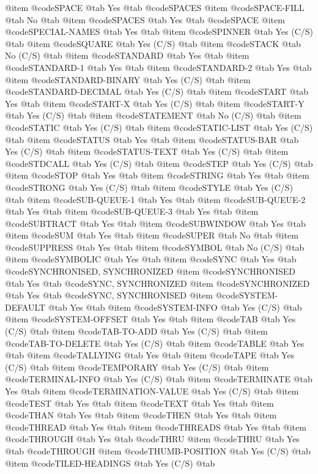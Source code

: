 @item @code{SPACE} @tab Yes @tab @code{SPACES}
@item @code{SPACE-FILL} @tab No @tab 
@item @code{SPACES} @tab Yes @tab @code{SPACE}
@item @code{SPECIAL-NAMES} @tab Yes @tab 
@item @code{SPINNER} @tab Yes	(C/S) @tab 
@item @code{SQUARE} @tab Yes	(C/S) @tab 
@item @code{STACK} @tab No	(C/S) @tab 
@item @code{STANDARD} @tab Yes @tab 
@item @code{STANDARD-1} @tab Yes @tab 
@item @code{STANDARD-2} @tab Yes @tab 
@item @code{STANDARD-BINARY} @tab Yes	(C/S) @tab 
@item @code{STANDARD-DECIMAL} @tab Yes	(C/S) @tab 
@item @code{START} @tab Yes @tab 
@item @code{START-X} @tab Yes	(C/S) @tab 
@item @code{START-Y} @tab Yes	(C/S) @tab 
@item @code{STATEMENT} @tab No	(C/S) @tab 
@item @code{STATIC} @tab Yes	(C/S) @tab 
@item @code{STATIC-LIST} @tab Yes	(C/S) @tab 
@item @code{STATUS} @tab Yes @tab 
@item @code{STATUS-BAR} @tab Yes	(C/S) @tab 
@item @code{STATUS-TEXT} @tab Yes	(C/S) @tab 
@item @code{STDCALL} @tab Yes	(C/S) @tab 
@item @code{STEP} @tab Yes	(C/S) @tab 
@item @code{STOP} @tab Yes @tab 
@item @code{STRING} @tab Yes @tab 
@item @code{STRONG} @tab Yes	(C/S) @tab 
@item @code{STYLE} @tab Yes	(C/S) @tab 
@item @code{SUB-QUEUE-1} @tab Yes @tab 
@item @code{SUB-QUEUE-2} @tab Yes @tab 
@item @code{SUB-QUEUE-3} @tab Yes @tab 
@item @code{SUBTRACT} @tab Yes @tab 
@item @code{SUBWINDOW} @tab Yes @tab 
@item @code{SUM} @tab Yes @tab 
@item @code{SUPER} @tab No @tab 
@item @code{SUPPRESS} @tab Yes @tab 
@item @code{SYMBOL} @tab No	(C/S) @tab 
@item @code{SYMBOLIC} @tab Yes @tab 
@item @code{SYNC} @tab Yes @tab @code{SYNCHRONISED, SYNCHRONIZED}
@item @code{SYNCHRONISED} @tab Yes @tab @code{SYNC, SYNCHRONIZED}
@item @code{SYNCHRONIZED} @tab Yes @tab @code{SYNC, SYNCHRONISED}
@item @code{SYSTEM-DEFAULT} @tab Yes @tab 
@item @code{SYSTEM-INFO} @tab Yes	(C/S) @tab 
@item @code{SYSTEM-OFFSET} @tab Yes @tab 
@item @code{TAB} @tab Yes	(C/S) @tab 
@item @code{TAB-TO-ADD} @tab Yes	(C/S) @tab 
@item @code{TAB-TO-DELETE} @tab Yes	(C/S) @tab 
@item @code{TABLE} @tab Yes @tab 
@item @code{TALLYING} @tab Yes @tab 
@item @code{TAPE} @tab Yes	(C/S) @tab 
@item @code{TEMPORARY} @tab Yes	(C/S) @tab 
@item @code{TERMINAL-INFO} @tab Yes	(C/S) @tab 
@item @code{TERMINATE} @tab Yes @tab 
@item @code{TERMINATION-VALUE} @tab Yes	(C/S) @tab 
@item @code{TEST} @tab Yes @tab 
@item @code{TEXT} @tab Yes @tab 
@item @code{THAN} @tab Yes @tab 
@item @code{THEN} @tab Yes @tab 
@item @code{THREAD} @tab Yes @tab 
@item @code{THREADS} @tab Yes @tab 
@item @code{THROUGH} @tab Yes @tab @code{THRU}
@item @code{THRU} @tab Yes @tab @code{THROUGH}
@item @code{THUMB-POSITION} @tab Yes	(C/S) @tab 
@item @code{TILED-HEADINGS} @tab Yes	(C/S) @tab 
